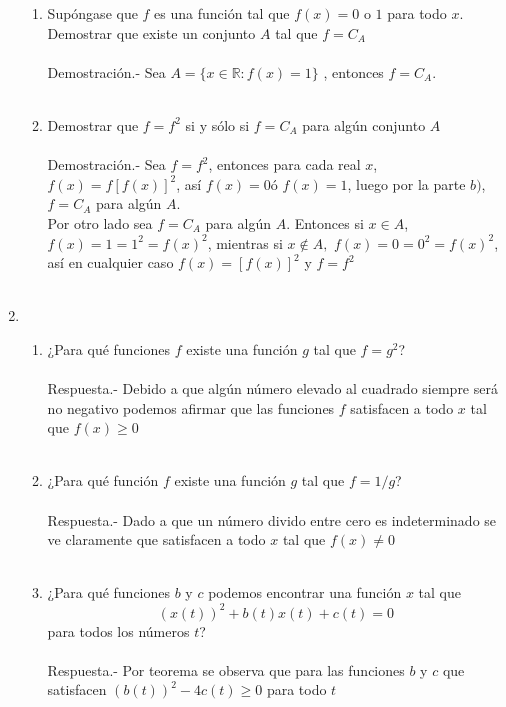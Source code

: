 \begin{enumerate}[\bfseries 1.]
\begin{enumerate}[\bfseries (a)]
	    \item Supóngase que $f$ es una función tal que $f(x)=0$ o $1$ para todo $x$. Demostrar que existe un conjunto $A$ tal que $f=C_A$\\\\
	    Demostración.-\; Sea $A=\lbrace x\in \mathbb{R}: f(x)=1\rbrace$ , entonces $f=C_A$.\\\\

	    \item Demostrar que $f=f^2$ si y sólo si $f=C_A$ para algún conjunto $A$\\\\
	    Demostración.-\; Sea $f=f^2$, entonces para cada real $x$, $f(x)=f[f(x)]^2$, así $f(x)=0$ó $f(x)=1$, luego por la parte $b)$, $f=C_A$ para algún $A$.\\
	    Por otro lado sea $f=C_A$ para algún $A$. Entonces si $x\in A$, $f(x)=1=1^2=f(x)^2$, mientras si $x\notin A,$ $f(x)=0=0^2=f(x)^2$, así en cualquier caso $f(x)=[f(x)]^2$ y $f=f^2$\\\\

	\end{enumerate}

	\item 
	\begin{enumerate}[\bfseries (a)]

	    \item ¿Para qué funciones $f$ existe una función $g$ tal que $f=g^2$?\\\\
	    Respuesta.-\; Debido a que algún número elevado al cuadrado siempre será no negativo podemos afirmar que las funciones $f$ satisfacen a todo $x$ tal que $f(x)\geq 0$\\\\

	    \item ¿Para qué función $f$ existe una función $g$ tal que $f=1/g$?\\\\
	    Respuesta.-\; Dado a que un número divido entre cero es indeterminado se ve claramente que satisfacen a todo $x$ tal que $f(x)\neq 0$\\\\

	    \item ¿Para qué funciones $b$ y $c$ podemos encontrar una función $x$ tal que $$(x(t))^2 + b(t)x(t)+c(t)=0$$ para todos los números $t$?\\\\
	    Respuesta.-\; Por teorema se observa que para las funciones $b$ \; y \; $c$ que satisfacen $(b(t))^2 - 4c(t) \geq 0$ para todo $t$\\\\ 


\end{enumerate}
\end{enumerate}
